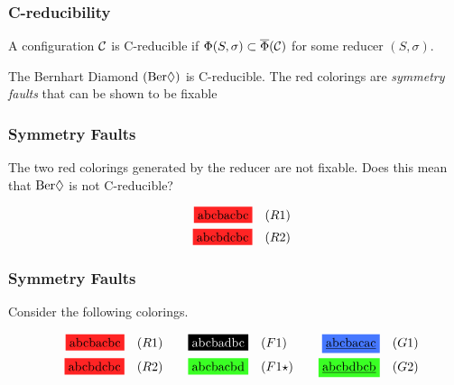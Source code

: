 \begin{frame}
    \frametitle{C-reducibility}

    \begin{definition}
        A configuration $\mathcal{C}$ is C-reducible if $\Phi(S,\sigma) \subset \overline{\Phi}(\mathcal{C})$ for some reducer $(S,\sigma)$.
    \end{definition}

    \begin{example}
        The Bernhart Diamond $(\text{Ber}\Diamond)$ is C-reducible. The red colorings are \textit{symmetry faults} that can be shown to be fixable
    \end{example}
\end{frame}

\begin{frame}
    \frametitle{Symmetry Faults}

    The two red colorings generated by the reducer are not fixable. Does this mean that $\text{Ber}\Diamond$ is not C-reducible?

    \begin{equation}
        \begin{aligned}
            \colorbox{rb}{abcbacbc} &\quad (R1) \\ \quad \colorbox{rb}{abcbdcbc} &\quad (R2)
        \end{aligned}
    \end{equation}

\end{frame}


\begin{frame}
    \frametitle{Symmetry Faults}

    Consider the following colorings.

    \begin{equation}
        \begin{aligned}
            \colorbox{rb}{abcbacbc} &\quad (R1) & \colorbox{sf}{\textcolor{white}{abcbadbc}} &\quad (F1) & \colorbox{rg}{\underline{abcbacac}} &\quad (G1)\\
             \quad \colorbox{rb}{abcbdcbc} &\quad (R2) & \quad \colorbox{g0}{abcbacbd} &\quad (F1\star) & \quad \colorbox{g0}{\underline{abcbdbcb}} &\quad (G2) \\
        \end{aligned}
    \end{equation}

\end{frame}

